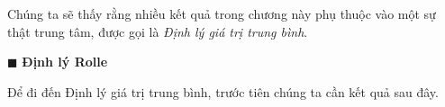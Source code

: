 \vspace{10pt}

\noindent
\begin{minipage}[t]{48mm}
\end{minipage}%
\hspace{7mm}%
\begin{minipage}[t]{125mm}
  {\fontsize{9.5}{13.5}\selectfont
  Chúng ta sẽ thấy rằng nhiều kết quả trong chương này phụ thuộc vào một sự thật trung tâm, được gọi là \textit{Định lý giá trị trung bình}.

  \vspace{8pt}
  {\color{stewartblue}$\blacksquare$}\;\; {\sffamily\bfseries Định lý Rolle}

  \vspace{3pt}
  Để đi đến Định lý giá trị trung bình, trước tiên chúng ta cần kết quả sau đây.
  }
\end{minipage}

\vspace{8pt}

